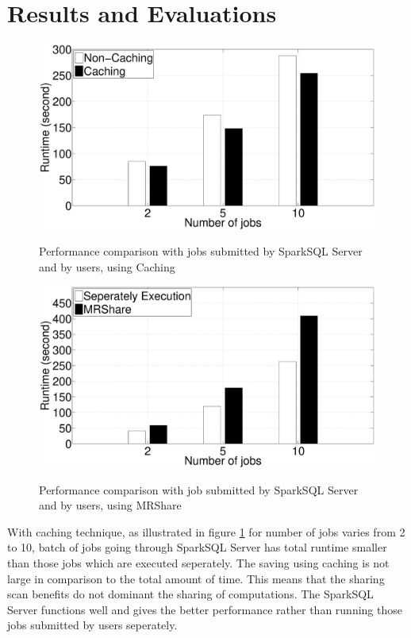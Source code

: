 
\section{Results and Evaluations}
\begin{figure}
\includegraphics[width=\textwidth]{Figures/caching-vs-non-caching.eps}
\label{fig:caching}
\caption{Performance comparison with jobs submitted by SparkSQL Server and by users, using Caching}
\end{figure}

\begin{figure}
\includegraphics[width=\textwidth]{Figures/multi-mrshare.eps}
\label{fig:mrshare}
\caption{Performance comparison with job submitted by SparkSQL Server and by users, using MRShare}
\end{figure}

With caching technique, as illustrated in figure \ref{fig:caching} for number of jobs varies from 2 to 10, batch of jobs going through SparkSQL Server has total runtime smaller than those jobs which are executed seperately. The saving using caching is not large in comparison to the total amount of time. This means that the sharing scan benefits do not dominant the sharing of computations. The SparkSQL Server functions well and gives the better performance rather than running those jobs submitted by users seperately.\\


